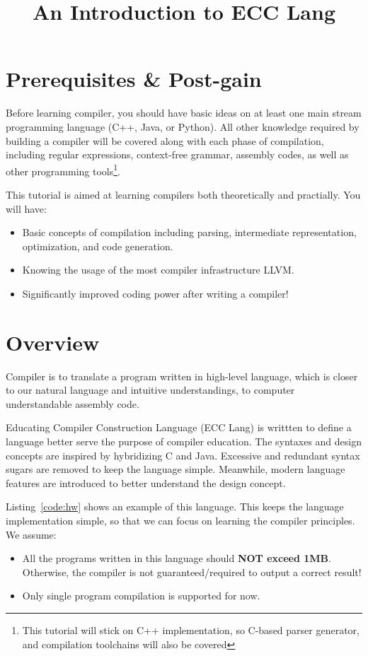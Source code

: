 \documentclass{article}
\title{An Introduction to ECC Lang}
\date{}
\begin{document}
\maketitle

\section{Prerequisites \& Post-gain}

Before learning compiler, you should have basic ideas on at least
one main stream programming language (C++, Java, or Python).
All other knowledge required by building a compiler will
be covered along with each phase of compilation, including
regular expressions, context-free grammar, assembly codes,
as well as other programming tools\footnote{This tutorial
will stick on C++ implementation, so C-based parser generator,
and compilation toolchains will also be covered}.

\noindent This tutorial is aimed at learning compilers
both theoretically and practially. You will have:
\begin{itemize}
  \item Basic concepts of compilation including parsing, intermediate representation,
    optimization, and code generation.
  \item Knowing the usage of the most compiler infrastructure LLVM.
  \item Significantly improved coding power after writing a compiler!
\end{itemize}

\section{Overview}

Compiler is to translate a program written in high-level language,
which is closer to our natural language and intuitive understandings,
to computer understandable assembly code.

\noindent Educating Compiler Construction Language (ECC Lang)
is writtten to define a language better serve the purpose of compiler education.
The syntaxes and design concepts are inspired by hybridizing C and Java.
Excessive and redundant syntax sugars are removed to keep
the language simple. Meanwhile, modern language features
are introduced to better understand the design concept.

\noindent Listing~\ref{code:hw} shows an example of this language.
This keeps the language implementation simple, so that we can focus on
learning the compiler principles.
We assume:
\begin{itemize}
  \item All the programs written in this language should \textbf{NOT exceed 1MB}.
    Otherwise, the compiler is not guaranteed/required to output a correct result!
  \item Only single program compilation is supported for now.
\end{itemize}
\end{document}
